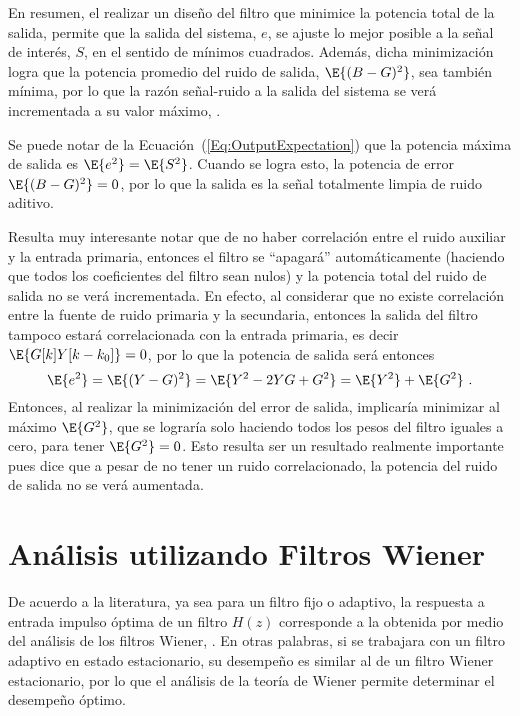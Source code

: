 En resumen, el realizar un diseño del filtro que minimice la potencia total de la salida, permite que la salida del sistema, $e$, se ajuste lo mejor posible a la señal de interés, $S$, en el sentido de mínimos cuadrados. Además, dicha minimización logra que la potencia promedio del ruido de salida, $\E{(B-G)^2}$, sea también mínima, por lo que la razón señal-ruido a la salida del sistema se verá incrementada a su valor máximo, \cite{widrow75-ncs}.

Se puede notar de la Ecuación~(\ref{Eq:OutputExpectation}) que la potencia máxima de salida es $\E{e^2}=\E{S^2}$. Cuando se logra esto, la potencia de error $\E{(B-G)^2}=0$, por lo que la salida es la señal totalmente limpia de ruido aditivo.

Resulta muy interesante notar que de no haber correlación entre el ruido auxiliar y la entrada primaria, entonces el filtro se ``apagará'' automáticamente (haciendo que todos los coeficientes del filtro sean nulos) y la potencia total del ruido de salida no se verá incrementada. En efecto, al considerar que no existe correlación entre la fuente de ruido primaria y la secundaria, entonces la salida del filtro tampoco estará correlacionada con la entrada primaria, es decir $\E{G[k]Y[k-k_0]} = 0$, por lo que la potencia de salida será entonces
$$\E{e^2} = \E{(Y - G)^2} = \E{Y^2 - 2YG + G^2} = \E{Y^2} + \E{G^2}~.$$
Entonces, al realizar la minimización del error de salida, implicaría minimizar al máximo $\E{G^2}$, que se lograría solo haciendo todos los pesos del filtro iguales a cero, para tener $\E{G^2} = 0$. Esto resulta ser un resultado realmente importante pues dice que a pesar de no tener un ruido correlacionado, la potencia del ruido de  salida no se verá aumentada.

\section{Análisis utilizando Filtros Wiener}
De acuerdo a la literatura, ya sea para un filtro fijo o adaptivo, la respuesta a entrada impulso óptima de un filtro $H(z)$ corresponde a la obtenida por medio del análisis de los filtros Wiener, \cite{haykin,gustafsson}. En otras palabras, si se trabajara con un filtro adaptivo en estado estacionario, su desempeño es similar al de un filtro Wiener estacionario, por lo que el análisis de la teoría de Wiener permite determinar el desempeño óptimo.

